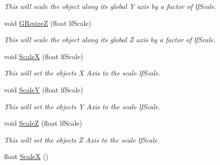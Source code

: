 \begin{DoxyCompactItemize}
\begin{DoxyCompactList}\small\item\em This will scale the object along its global Y axis by a factor of lfScale. \end{DoxyCompactList}\item 
\hypertarget{classc_matrix4_a74217e4c12e8f5623a572535ba443bc4}{
void \hyperlink{classc_matrix4_a74217e4c12e8f5623a572535ba443bc4}{GResizeZ} (float lfScale)}
\label{classc_matrix4_a74217e4c12e8f5623a572535ba443bc4}

\begin{DoxyCompactList}\small\item\em This will scale the object along its global Z axis by a factor of lfScale. \end{DoxyCompactList}\item 
\hypertarget{classc_matrix4_ab9bcc91e12de78a59b4d80c43c3e02ba}{
void \hyperlink{classc_matrix4_ab9bcc91e12de78a59b4d80c43c3e02ba}{ScaleX} (float lfScale)}
\label{classc_matrix4_ab9bcc91e12de78a59b4d80c43c3e02ba}

\begin{DoxyCompactList}\small\item\em This will set the objects X Axis to the scale lfScale. \end{DoxyCompactList}\item 
\hypertarget{classc_matrix4_a1f3a9e6f7112e30b1bdb8613fed6283b}{
void \hyperlink{classc_matrix4_a1f3a9e6f7112e30b1bdb8613fed6283b}{ScaleY} (float lfScale)}
\label{classc_matrix4_a1f3a9e6f7112e30b1bdb8613fed6283b}

\begin{DoxyCompactList}\small\item\em This will set the objects Y Axis to the scale lfScale. \end{DoxyCompactList}\item 
\hypertarget{classc_matrix4_afd1edcc26e0ff510c101b417f8c2dd36}{
void \hyperlink{classc_matrix4_afd1edcc26e0ff510c101b417f8c2dd36}{ScaleZ} (float lfScale)}
\label{classc_matrix4_afd1edcc26e0ff510c101b417f8c2dd36}

\begin{DoxyCompactList}\small\item\em This will set the objects Z Axis to the scale lfScale. \end{DoxyCompactList}\item 
\hypertarget{classc_matrix4_a952f122af09dcc26dae75b137874249c}{
float \hyperlink{classc_matrix4_a952f122af09dcc26dae75b137874249c}{ScaleX} ()}
\label{classc_matrix4_a952f122af09dcc26dae75b137874249c}


\end{DoxyCompactItemize}
